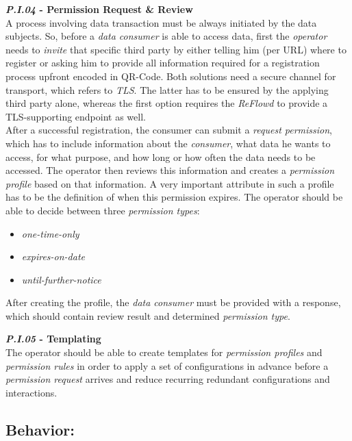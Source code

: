 \documentclass[12pt,english,a4paper,titlepage,cleardoublepage=empty,dottedtoc]{report}
\providecommand{\tightlist}{%
  \setlength{\itemsep}{0pt}\setlength{\parskip}{0pt}}
\begin{document}
\textbf{\emph{\protect\hypertarget{pi04}{}{P.I.04}} - Permission Request
\& Review}\\
A process involving data transaction must be always initiated by the
data subjects. So, before a \emph{data consumer} is able to access data,
first the \emph{operator} needs to \emph{invite} that specific third
party by either telling him (per URL) where to register or asking him to
provide all information required for a registration process upfront
encoded in QR-Code. Both solutions need a secure channel for transport,
which refers to \emph{TLS}. The latter has to be ensured by the applying
third party alone, whereas the first option requires the \emph{ReFlowd}
to provide a TLS-supporting endpoint as well.\\
After a successful registration, the consumer can submit a \emph{request
permission}, which has to include information about the \emph{consumer},
what data he wants to access, for what purpose, and how long or how
often the data needs to be accessed. The operator then reviews this
information and creates a \emph{permission profile} based on that
information. A very important attribute in such a profile has to be the
definition of when this permission expires. The operator should be able
to decide between three \emph{permission types}:

\begin{itemize}
\tightlist
\item
  \emph{one-time-only}
\item
  \emph{expires-on-date}
\item
  \emph{until-further-notice}
\end{itemize}

After creating the profile, the \emph{data consumer} must be provided
with a response, which should contain review result and determined
\emph{permission type}.

\textbf{\emph{\protect\hypertarget{pi05}{}{P.I.05}} - Templating}\\
The operator should be able to create templates for \emph{permission
profiles} and \emph{permission rules} in order to apply a set of
configurations in advance before a \emph{permission request} arrives and
reduce recurring redundant configurations and interactions.

\subsection*{Behavior:}\label{behavior}
\end{document}
